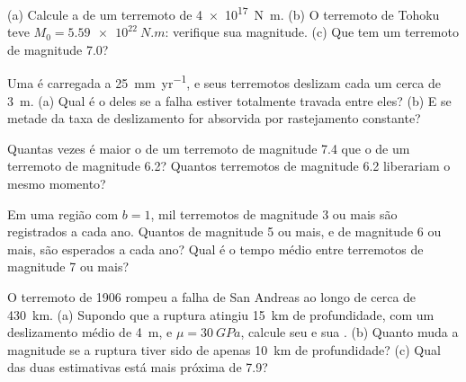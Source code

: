 \begin{exercise}[$\star$]\label{exo:b1:earthquake-source:1}
(a) Calcule a  de um terremoto de 
\qty{4e17}{N.m}. (b) O terremoto de Tohoku teve $M_0 = \qty{5.59e22}{N.m}$:
verifique sua magnitude. (c) Que  tem um terremoto de magnitude
7.0?
\end{exercise}

\begin{exercise}[$\star$]\label{exo:b1:earthquake-source:2}
Uma  é carregada a \qty{25}{mm.yr^{-1}}, e seus terremotos deslizam cada um cerca de \qty{3}{m}. (a) Qual é o  deles se a
falha estiver totalmente travada entre eles? (b) E se metade da taxa de deslizamento for absorvida por rastejamento constante?
\end{exercise}

\begin{exercise}[$\star$]\label{exo:b1:earthquake-source:3}
Quantas vezes é maior o  de um terremoto de magnitude 7.4 que o de um terremoto de magnitude 6.2? Quantos terremotos de magnitude 6.2 liberariam o mesmo momento?
\end{exercise}

\begin{exercise}[$\star$]\label{exo:b1:earthquake-source:4}
Em uma região com $b = 1$, mil terremotos de magnitude 3 ou mais são registrados a cada ano. Quantos de magnitude 5 ou mais, e de magnitude 6 ou mais, são esperados a cada ano? Qual é o tempo médio entre terremotos de magnitude 7 ou mais?
\end{exercise}

\begin{exercise}[$\star\star$]\label{exo:b1:earthquake-source:5}
O terremoto de 1906 rompeu a falha de San Andreas ao longo de cerca de \qty{430}{km}. (a) Supondo que a ruptura atingiu \qty{15}{km} de profundidade, com um deslizamento médio de \qty{4}{m}, e $\mu = \qty{30}{GPa}$, calcule seu  e sua . (b) Quanto muda a magnitude se a ruptura tiver sido de apenas \qty{10}{km} de profundidade? (c) Qual das duas estimativas está mais próxima de 7.9?
\end{exercise}

